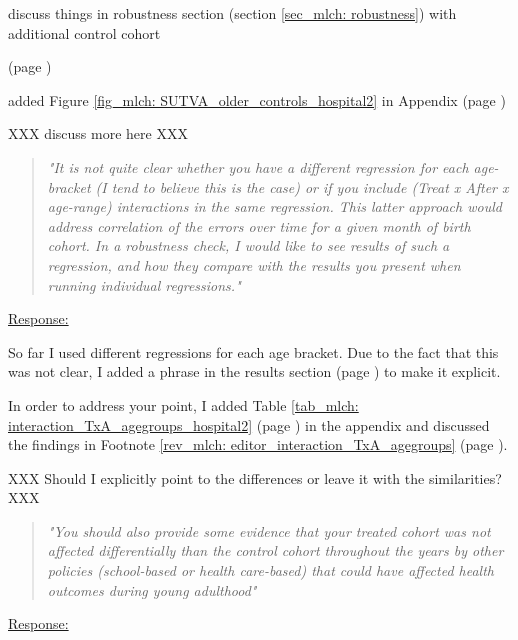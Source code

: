 discuss things in robustness section (section \ref{sec_mlch: robustness}) with additional control cohort

(page \pageref{rev_mlch: editor_SUTVA_older_cohorts})


added Figure \ref{fig_mlch: SUTVA_older_controls_hospital2} in Appendix (page \pageref{fig_mlch: SUTVA_older_controls_hospital2})

XXX discuss more here XXX


\bigskip
\begin{quote}
	\textit{"It is not quite clear whether you have a different regression for each age-bracket (I tend to believe this is the case) or if you include (Treat x After x age-range) interactions in the same regression. This latter approach would address correlation of the errors over time for a given month of birth cohort. In a robustness check, I would like to see results of such a regression, and how they compare with the results you present when running individual regressions."}
\end{quote}
\underline{Response:}


So far I used different regressions for each age bracket. Due to the fact that this was not clear, I added a phrase in the results section (page \pageref{rev_mlch: editor_comprehension_interaction}) to make it explicit.

In order to address your point, I added Table \ref{tab_mlch: interaction_TxA_agegroups_hospital2} (page \pageref{tab_mlch: interaction_TxA_agegroups_hospital2}) in the appendix and discussed the findings in Footnote \ref{rev_mlch: editor_interaction_TxA_agegroups} (page \pageref{rev_mlch: editor_interaction_TxA_agegroups}).

XXX Should I explicitly point to the differences or leave it with the similarities? XXX





\bigskip
\begin{quote}
	\textit{"You should also provide some evidence that your treated cohort was not affected differentially than the control cohort throughout the years by other policies (school-based or health care-based) that could have affected health outcomes during young adulthood"}
\end{quote}
\underline{Response:}












